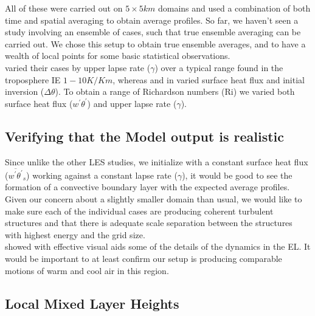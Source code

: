  All of these were carried out on $5 \times 5 km$ domains and used a combination of both time and spatial averaging to obtain average profiles.  So far, we haven't seen a study involving an ensemble of cases, such that true ensemble averaging can be carried out.  We chose this setup to obtain true ensemble averages, and to have a wealth of local points for some basic statistical observations.\\

\citeauthor{FedConzMir04} \cite{FedConzMir04} varied their cases by upper lapse rate ($\gamma$) over a typical range found in the troposphere IE $1 - 10 K / Km$, whereas \citeauthor{SullMoengStev} \cite{SullMoengStev} and \citeauthor{BrooksFowler2} in \cite{BrooksFowler2} varied surface heat flux and initial inversion ($\Delta \theta$).  To obtain a range of Richardson numbers (\acs{Ri}) we varied both surface heat flux ($w^{'}\theta^{'}$) and upper lapse rate ($\gamma$).\\

\subsection{Verifying that the Model output is realistic}

Since unlike the other LES studies, we initialize with a constant surface heat flux ($\overline{w^{'}\theta^{'}}_{s}$) working against a constant lapse rate ($\gamma$), it would be good to see the formation of a convective boundary layer with the expected average profiles.\\

Given our concern about a slightly smaller domain than usual, we would like to make sure each of the individual cases are producing coherent turbulent structures and that there is adequate scale separation between the structures with highest energy and the grid size.\\

\citeauthor{SullMoengStev} \cite{SullMoengStev} showed with effective visual aids some of the details of the dynamics in the \acs{EL}.  It would be important to at least confirm our setup is producing comparable motions of warm and cool air in this region.\\  


\subsection{Local Mixed Layer Heights}

